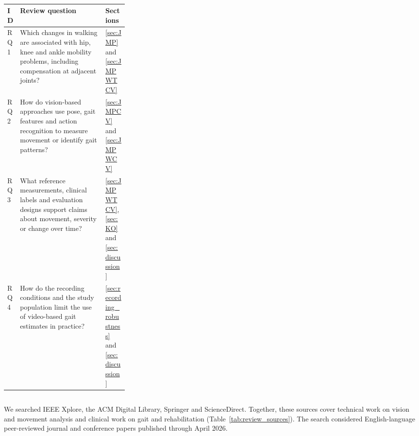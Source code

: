\begin{table}[!htbp]
\centering\small
\caption{}
\label{tab:review_questions}
\color{RevisionRed}\hypersetup{allcolors=RevisionRed}
\renewcommand{\arraystretch}{1.09}
\begin{tabularx}{0.98\linewidth}{@{}p{0.10\linewidth}>{\raggedright\arraybackslash}X p{0.19\linewidth}@{}}
\toprule
\textbf{ID} & \textbf{Review question} & \textbf{Sections} \\
\midrule
RQ1 & Which changes in walking are associated with hip, knee and ankle mobility problems, including compensation at adjacent joints? & \ref{sec:JMP} and \ref{sec:JMPWTCV} \\ \addlinespace[3pt]
RQ2 & How do vision-based approaches use pose, gait features and action recognition to measure movement or identify gait patterns? & \ref{sec:JMPCV} and \ref{sec:JMPWCV} \\ \addlinespace[3pt]
RQ3 & What reference measurements, clinical labels and evaluation designs support claims about movement, severity or change over time? & \ref{sec:JMPWTCV}, \ref{sec:KO} and \ref{sec:discussion} \\ \addlinespace[3pt]
RQ4 & How do the recording conditions and the study population limit the use of video-based gait estimates in practice? & \ref{sec:recording_robustness} and \ref{sec:discussion} \\
\bottomrule
\end{tabularx}
\end{table}

\subsection{}
\label{sec:search_sources}
\begin{redrevision}
We searched IEEE Xplore, the ACM Digital Library, Springer and ScienceDirect. Together, these sources cover technical work on vision and movement analysis and clinical work on gait and rehabilitation (Table~\ref{tab:review_sources}). The search considered English-language peer-reviewed journal and conference papers published through April 2026. 
\end{redrevision}

